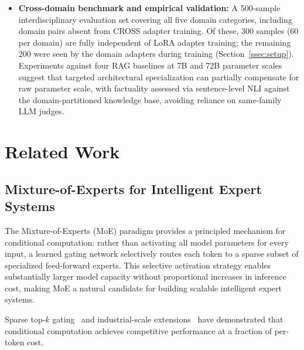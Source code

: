 \documentclass[a4paper,fleql]{cas-sc}
\begin{document}
\begin{itemize}
    \item \textbf{Cross-domain benchmark and empirical validation:}
    A 500-sample interdisciplinary evaluation set covering all five domain categories,
    including domain pairs absent from CROSS adapter training.
    Of these, 300 samples (60 per domain) are fully independent of LoRA adapter
    training; the remaining 200 were seen by the domain adapters during training
    (Section~\ref{ssec:setup}).
    Experiments against four RAG baselines at 7B and 72B parameter scales suggest
    that targeted architectural specialization can partially compensate for raw
    parameter scale, with factuality assessed via sentence-level NLI against the
    domain-partitioned knowledge base, avoiding reliance on same-family LLM judges.
\end{itemize}


\section{Related Work}
\label{sec:related}

\subsection{Mixture-of-Experts for Intelligent Expert Systems}
The Mixture-of-Experts (MoE) paradigm \citep{shazeer2017outrageously} provides
a principled mechanism for conditional computation: rather than activating all
model parameters for every input, a learned gating network selectively routes
each token to a sparse subset of specialized feed-forward experts. This
selective activation strategy enables substantially larger model capacity
without proportional increases in inference cost, making MoE a natural
candidate for building scalable intelligent expert systems.

Sparse top-$k$ gating~\citep{fedus2022switch,jiang2024mixtral} and
industrial-scale extensions~\citep{deepseekai2025deepseekv3} have demonstrated
that conditional computation achieves competitive performance at a fraction of
per-token cost.
\end{document}
